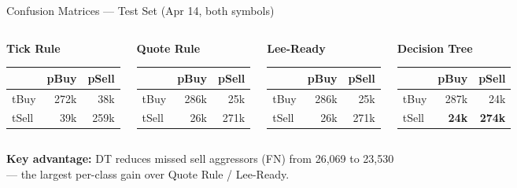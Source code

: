 \documentclass[aspectratio=169,10pt]{beamer}
\begin{document}
\begin{frame}{Confusion Matrices — Test Set (Apr 14, both symbols)}
  \begin{columns}
    \begin{center}
    \textbf{Tick Rule}\\[0.4em]
    {\small
    \begin{tabular}{lrr}
      \toprule
       & pBuy & pSell \\
      \midrule
      tBuy  & 272k & 38k \\
      tSell & 39k  & 259k \\
      \bottomrule
    \end{tabular}}
    \end{center}

    \begin{center}
    \textbf{Quote Rule}\\[0.4em]
    {\small
    \begin{tabular}{lrr}
      \toprule
       & pBuy & pSell \\
      \midrule
      tBuy  & 286k & 25k \\
      tSell & 26k  & 271k \\
      \bottomrule
    \end{tabular}}
    \end{center}

    \begin{center}
    \textbf{Lee-Ready}\\[0.4em]
    {\small
    \begin{tabular}{lrr}
      \toprule
       & pBuy & pSell \\
      \midrule
      tBuy  & 286k & 25k \\
      tSell & 26k  & 271k \\
      \bottomrule
    \end{tabular}}
    \end{center}

    \begin{center}
    \textbf{\textcolor{okgreen}{Decision Tree}}\\[0.4em]
    {\small
    \begin{tabular}{lrr}
      \toprule
       & pBuy & pSell \\
      \midrule
      tBuy  & 287k & 24k \\
      \rowcolor{winrow}
      tSell & \textbf{24k}  & \textbf{274k} \\
      \bottomrule
    \end{tabular}}
    \end{center}
  \end{columns}

  \bigskip
  \begin{center}
  \textbf{Key advantage:} DT reduces missed sell aggressors (FN) from 26{,}069 to 23{,}530
  — the largest per-class gain over Quote Rule / Lee-Ready.
  \end{center}
\end{frame}
\end{document}
